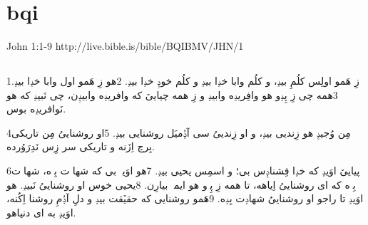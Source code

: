 \documentclass[12pt,fleqn,titlepage,twoside,a4paper]{book}
\begin{document}
\section{bqi}

John 1:1-9 http://live.bible.is/bible/BQIBMV/JHN/1

\begin{arab}[utf]

\section*{}


1زِ هَمو اولِس کلُمِ بیݚ، و کلُم وابا خݚا بیݚ و کلُم خوݚِ خݚا بیݚ.
2هو زِ هَمو اول وابا خݚا بیݚ.
3همه چی زِ پِݚو هو وافِریݚه وابیݚ و زِ همه چیاییٚ که وافریݚه وابیݚِن، چی نَبیݚ که هو نَوافریݚه بوس.

4مِن وُجیݚِ هو زِندیی بیݚ، و او زِندییُ سی آݚُمیَل روشنایی بیݚ.
5او روشنایی‌ُ مِن تاریکی بِرچ اِزَنه و تاریکی سر زِس نَدِرَوُرده.

6پیاییٚ اوَیݚ که خݚا فِشناݚِس بی؛ و اسمِس یحیی بیݚ.
7هو اوَیݚ بی که شهاݚت بِݚه، شهاݚت بِݚه که ای روشنایی‌ُ اِیاهه، تا همه زِ پِݚو هو ایموٚۨ بیارِن.
8یحیی خوس او روشناییُ‌ نَبیݚ. هو اوَیݚ تا راجو او روشناییُ‌‌ شهاݚت بِݚه.
9هَمو روشنایی که حقیٚقت بیݚ و دلِ آݚُمِ روشنا اِکُنه، اوَیݚ به ای دنیاهو.

\end{arab}
\end{document}
